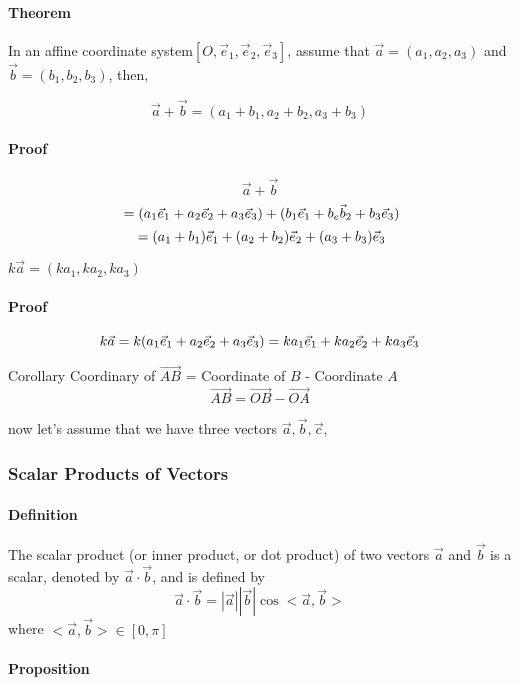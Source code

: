 \documentclass[11pt]{book}
\begin{document}
\paragraph{ Theorem}  In an affine coordinate system$[O,\vec e_1,\vec e_2,\vec e_3]$, 
assume that $\vec a = (a_1, a_2, a_3)$ and $\vec b = (b_1, b_2, b_3)$, then,

$$\vec a +\vec b = (a_1+b_1,a_2+b_2,a_3+b_3)$$

\paragraph{ Proof}
$$
\vec a + \vec b  
$$
$$
\\ = (a_1\vec e_1 + a_2 \vec e_2 + a_3\vec e_3 )+ (b_1\vec e_1 + b_e \vec b_2 + b_3\vec e_3 ) 
$$
$$
\\ = (a_1+b_1)\vec e_1 + (a_2+b_2) \vec e_2 + (a_3+b_3) \vec e_3
$$

$k \vec a  = (ka_1,ka_2,ka_3)$

\paragraph{Proof}
$$
k \vec a 
\\ = k(a_1\vec e_1 + a_2 \vec e_2 + a_3\vec e_3)
\\ = k a_1\vec e_1 + k a_2 \vec e_2 + k a_3\vec e_3
$$


Corollary Coordinary of $\overrightarrow {AB}$ = Coordinate of $B$  - Coordinate $A$
$$
\overrightarrow{AB} = \overrightarrow{OB} - \overrightarrow {OA}
$$

now let's assume that we have three vectors $\vec a ,\vec b , \vec c$,


\subsubsection{Scalar Products of Vectors}


\paragraph{ Definition}
The scalar product (or inner product, or dot product) of two vectors $\vec a$ and $\vec b$ is a scalar, denoted by $\vec a \cdot \vec b$, and is defined by 
$$
\vec a \cdot \vec b  = |\vec a||\vec b|\cos<\vec a,\vec b >
$$
where $ <\vec a,\vec b>\in [0,\pi] $

\paragraph{ Proposition}
\end{document}
